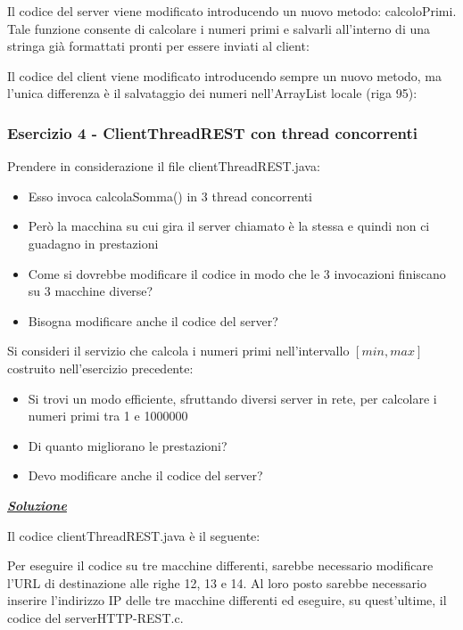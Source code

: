 \documentclass[a4paper]{article}
\begin{document}
	\noindent
	Il codice del server viene modificato introducendo un nuovo metodo: \textsf{calcoloPrimi}. Tale funzione consente di calcolare i numeri primi e salvarli all'interno di una stringa già formattati pronti per essere inviati al client:
	\newpage
	
	\noindent
	Il codice del client viene modificato introducendo sempre un nuovo metodo, ma l'unica differenza è il salvataggio dei numeri nell'\textsf{ArrayList} locale (riga 95):
	\newpage
	
	\subsubsection{Esercizio 4 - \textsf{ClientThreadREST} con thread concorrenti}
	
	Prendere in considerazione il file \textsf{clientThreadREST.java}:
	\begin{itemize}
		\item Esso invoca \textsf{calcolaSomma()} in 3 thread concorrenti
		
		\item Però la macchina su cui gira il server chiamato è la stessa e quindi non ci guadagno in prestazioni
		
		\item Come si dovrebbe modificare il codice in modo che le 3 invocazioni finiscano su 3 macchine diverse?
		
		\item Bisogna modificare anche il codice del server?
	\end{itemize}
	Si consideri il servizio che calcola i numeri primi nell'intervallo $\left[min, max\right]$ costruito nell'esercizio precedente:
	\begin{itemize}
		\item Si trovi un modo efficiente, sfruttando diversi server in rete, per calcolare i numeri primi tra 1 e 1000000
		
		\item Di quanto migliorano le prestazioni?
		
		\item Devo modificare anche il codice del server?
	\end{itemize}
	
	\noindent
	\textcolor{Green4}{\underline{\textbf{\emph{Soluzione}}}}\newline
	
	\noindent
	Il codice \textsf{clientThreadREST.java} è il seguente:
	
	Per eseguire il codice su tre macchine differenti, sarebbe necessario modificare l'URL di destinazione alle righe 12, 13 e 14. Al loro posto sarebbe necessario inserire l'indirizzo IP delle tre macchine differenti ed eseguire, su quest'ultime, il codice del \textsf{serverHTTP-REST.c}.\newpage
	
\end{document}

